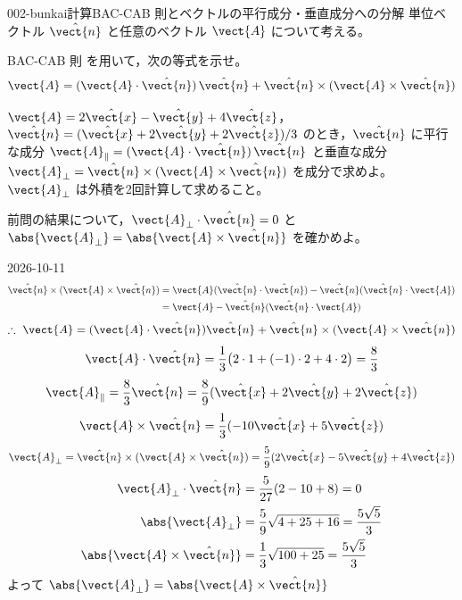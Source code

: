 \documentclass[uplatex,dvipdfmx,a4paper,11pt]{jsarticle}
\begin{document}
\mondaihen
{}
\begin{mondai}{002-bunkai}{計算}{BAC-CAB 則とベクトルの平行成分・垂直成分への分解}
単位ベクトル $\hat{\vect{n}}$ と任意のベクトル $\vect{A}$ について考える。
  \begin{shoumon}
    \item BAC-CAB 則  を用いて，次の等式を示せ。
    \[ \vect{A} = (\vect{A}\cdot\hat{\vect{n}})\,\hat{\vect{n}} + \hat{\vect{n}}\times(\vect{A}\times\hat{\vect{n}}) \]
    \item $\vect{A} = 2\hat{\vect{x}} - \hat{\vect{y}} + 4\hat{\vect{z}}$，$\hat{\vect{n}} = (\hat{\vect{x}} + 2\hat{\vect{y}} + 2\hat{\vect{z}})/3$ のとき，$\hat{\vect{n}}$ に平行な成分 $\vect{A}_{\parallel} = (\vect{A}\cdot\hat{\vect{n}})\,\hat{\vect{n}}$ と垂直な成分 $\vect{A}_{\perp} = \hat{\vect{n}}\times(\vect{A}\times\hat{\vect{n}})$ を成分で求めよ。$\vect{A}_{\perp}$ は外積を2回計算して求めること。
    \item 前問の結果について，$\vect{A}_{\perp}\cdot\hat{\vect{n}} = 0$ と $\abs{\vect{A}_{\perp}} = \abs{\vect{A}\times\hat{\vect{n}}}$ を確かめよ。
  \end{shoumon}
\begin{kotaeutsushi}{2026-10-11}
\begin{align*}
\hat{\vect{n}}\times(\vect{A}\times\hat{\vect{n}})&=\vect{A}(\hat{\vect{n}}\cdot\hat{\vect{n}})-\hat{\vect{n}}(\hat{\vect{n}}\cdot\vect{A})\\
&=\vect{A}-\hat{\vect{n}}(\hat{\vect{n}}\cdot\vect{A})
\end{align*}
\[ \therefore\ \vect{A}=(\vect{A}\cdot\hat{\vect{n}})\hat{\vect{n}}+\hat{\vect{n}}\times(\vect{A}\times\hat{\vect{n}}) \]
\[ \vect{A}\cdot\hat{\vect{n}}=\frac{1}{3}\bigl(2\cdot1+(-1)\cdot2+4\cdot2\bigr)=\frac{8}{3} \]
\[ \vect{A}_{\parallel}=\frac{8}{3}\hat{\vect{n}}=\frac{8}{9}(\hat{\vect{x}}+2\hat{\vect{y}}+2\hat{\vect{z}}) \]
\[ \vect{A}\times\hat{\vect{n}}=\frac{1}{3}(-10\hat{\vect{x}}+5\hat{\vect{z}}) \]
\[ \vect{A}_{\perp}=\hat{\vect{n}}\times(\vect{A}\times\hat{\vect{n}})=\frac{5}{9}(2\hat{\vect{x}}-5\hat{\vect{y}}+4\hat{\vect{z}}) \]
\begin{align*}
\vect{A}_{\perp}\cdot\hat{\vect{n}}&=\frac{5}{27}(2-10+8)=0\\
\abs{\vect{A}_{\perp}}&=\frac{5}{9}\sqrt{4+25+16}=\frac{5\sqrt{5}}{3}\\
\abs{\vect{A}\times\hat{\vect{n}}}&=\frac{1}{3}\sqrt{100+25}=\frac{5\sqrt{5}}{3}
\end{align*}
よって $\abs{\vect{A}_{\perp}}=\abs{\vect{A}\times\hat{\vect{n}}}$
\end{kotaeutsushi}
\end{mondai}
\end{document}

